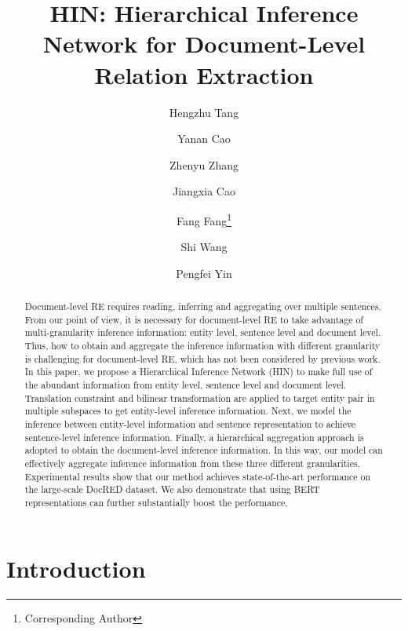 \documentclass[runningheads]{llncs}
\begin{document}
\title{HIN: Hierarchical Inference Network for Document-Level Relation Extraction}
\author{Hengzhu Tang \and
Yanan Cao \and
Zhenyu Zhang \and
Jiangxia Cao \and
Fang Fang\thanks{Corresponding Author}\and
Shi Wang \and
Pengfei Yin
}
\maketitle              \begin{abstract}
Document-level RE requires reading, inferring and aggregating over multiple sentences.
From our point of view, it is necessary for document-level RE to take advantage of multi-granularity inference information: entity level, sentence level and document level. 
Thus, how to obtain and aggregate the inference information with different granularity is challenging for document-level RE, 
which has not been considered by previous work.
In this paper, we propose a Hierarchical Inference Network (HIN) to make full use of the abundant information from entity level, sentence level and document level.
Translation constraint and bilinear transformation are applied to target entity pair in multiple subspaces to get entity-level inference information.
Next, we model the inference between entity-level information and sentence representation to achieve sentence-level inference information.
Finally, a hierarchical aggregation approach is adopted to obtain the document-level inference information.
In this way, our model can effectively aggregate inference information from these three different granularities.
Experimental results show that our method achieves state-of-the-art performance on the large-scale DocRED dataset.
We also demonstrate that using BERT representations can further substantially boost the performance.


\end{abstract}
\section{Introduction}
\end{document}
